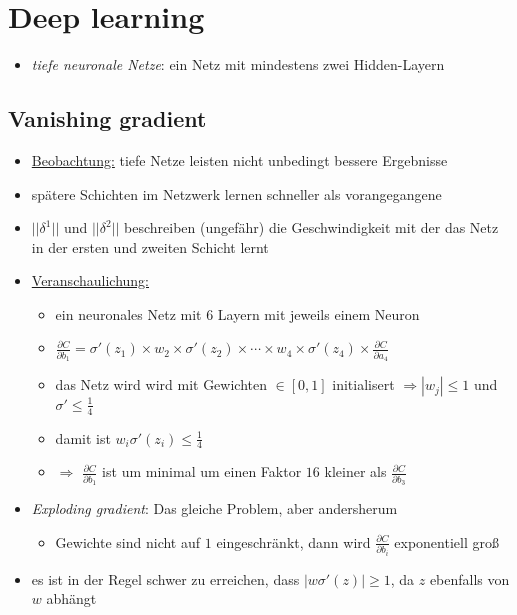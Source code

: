 \section{Deep learning}

\begin{itemize}
  \item \emph{tiefe neuronale Netze}: ein Netz mit mindestens zwei Hidden-Layern
\end{itemize}

\subsection{Vanishing gradient}

\begin{itemize}
  \item \underline{Beobachtung:} tiefe Netze leisten nicht unbedingt bessere Ergebnisse
  \item spätere Schichten im Netzwerk lernen schneller als vorangegangene
  \item $||\delta^1||$ und $||\delta^2||$ beschreiben (ungefähr) die Geschwindigkeit mit der das Netz in der ersten und zweiten Schicht lernt
  \item \underline{Veranschaulichung:}
  \begin{itemize}
    \item ein neuronales Netz mit 6 Layern mit jeweils einem Neuron
    \item $\frac{\partial C}{\partial b_1} = \sigma'(z_1) \times w_2 \times \sigma'(z_2) \times \cdots \times w_4 \times \sigma'(z_4) \times \frac{\partial C}{\partial a_4}$
    \item das Netz wird wird mit Gewichten $\in [0,1]$ initialisert $\Rightarrow |w_j| \leq 1$ und $\sigma' \leq \frac{1}{4}$
    \item damit ist $w_i \sigma'(z_i) \leq \frac{1}{4}$
    \item $\Rightarrow$ $\frac{\partial C}{\partial b_1}$ ist um minimal um einen Faktor $16$ kleiner als $\frac{\partial C}{\partial b_3}$
  \end{itemize}
  \item \emph{Exploding gradient}: Das gleiche Problem, aber andersherum
  \begin{itemize}
    \item Gewichte sind nicht auf $1$ eingeschränkt, dann wird $\frac{\partial C}{\partial b_i}$ exponentiell groß
  \end{itemize}
\item es ist in der Regel schwer zu erreichen, dass $|w \sigma'(z)| \geq 1$, da $z$ ebenfalls von $w$ abhängt
\end{itemize}
